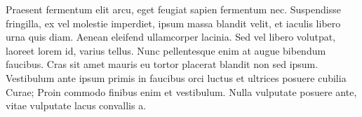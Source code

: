 Praesent fermentum elit arcu, eget feugiat sapien fermentum nec. Suspendisse fringilla, ex vel molestie imperdiet, ipsum massa blandit velit, et iaculis libero urna quis diam. Aenean eleifend ullamcorper lacinia. Sed vel libero volutpat, laoreet lorem id, varius tellus. Nunc pellentesque enim at augue bibendum faucibus. Cras sit amet mauris eu tortor placerat blandit non sed ipsum. Vestibulum ante ipsum primis in faucibus orci luctus et ultrices posuere cubilia Curae; Proin commodo finibus enim et vestibulum. Nulla vulputate posuere ante, vitae vulputate lacus convallis a. 